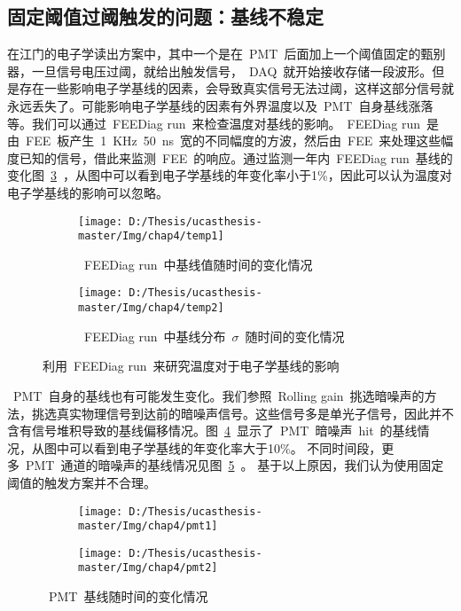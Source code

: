 \subsection{固定阈值过阈触发的问题：基线不稳定}
在江门的电子学读出方案中，其中一个是在~PMT~后面加上一个阈值固定的甄别器，一旦信号电压过阈，就给出触发信号，~DAQ~就开始接收存储一段波形。但是存在一些影响电子学基线的因素，会导致真实信号无法过阈，这样这部分信号就永远丢失了。可能影响电子学基线的因素有外界温度以及~PMT~自身基线涨落等。我们可以通过~FEEDiag run~来检查温度对基线的影响。~FEEDiag run~是由~FEE~板产生~1~KHz~50~ns~宽的不同幅度的方波，然后由~FEE~来处理这些幅度已知的信号，借此来监测~FEE~的响应。通过监测一年内~FEEDiag run~基线的变化图~\ref{fig:temp}~，从图中可以看到电子学基线的年变化率小于1\%，因此可以认为温度对电子学基线的影响可以忽略。
\begin{figure}[!htb]
  \centering
  \begin{subfigure}[b]{\MySubFactor\textwidth}
    \texttt{[image: D:/Thesis/ucasthesis-master/Img/chap4/temp1]}
    \caption{~FEEDiag run~中基线值随时间的变化情况 }
    \label{fig:temp_1}
  \end{subfigure}%
  \quad\quad\quad\quad\quad\quad%
  \begin{subfigure}[b]{\MySubFactor\textwidth}
    \texttt{[image: D:/Thesis/ucasthesis-master/Img/chap4/temp2]}
    \caption{ ~FEEDiag run~中基线分布~$\sigma$~随时间的变化情况}
    \label{fig:temp_2}
  \end{subfigure}
    \caption{ 利用~FEEDiag run~来研究温度对于电子学基线的影响}
  \label{fig:temp}
\end{figure}
~PMT~自身的基线也有可能发生变化。我们参照~Rolling gain~挑选暗噪声的方法，挑选真实物理信号到达前的暗噪声信号。这些信号多是单光子信号，因此并不含有信号堆积导致的基线偏移情况。图~\ref{fig:pmt_1}~显示了~PMT~暗噪声~hit~的基线情况，从图中可以看到电子学基线的年变化率大于10\%。 不同时间段，更多~PMT~通道的暗噪声的基线情况见图~\ref{fig:pmt_2}~。
基于以上原因，我们认为使用固定阈值的触发方案并不合理。
\begin{figure}[!htbp]
  \centering
  \begin{subfigure}[b]{\MySubFactor\textwidth}
    \texttt{[image: D:/Thesis/ucasthesis-master/Img/chap4/pmt1]}
    \caption{ }
    \label{fig:pmt_1}
  \end{subfigure}%
  \quad\quad\quad\quad\quad\quad%
  \begin{subfigure}[b]{\MySubFactor\textwidth}
    \texttt{[image: D:/Thesis/ucasthesis-master/Img/chap4/pmt2]}
    \caption{ }
    \label{fig:pmt_2}
  \end{subfigure}
    \caption{~PMT~基线随时间的变化情况}
  \label{fig:pmt}
\end{figure}
